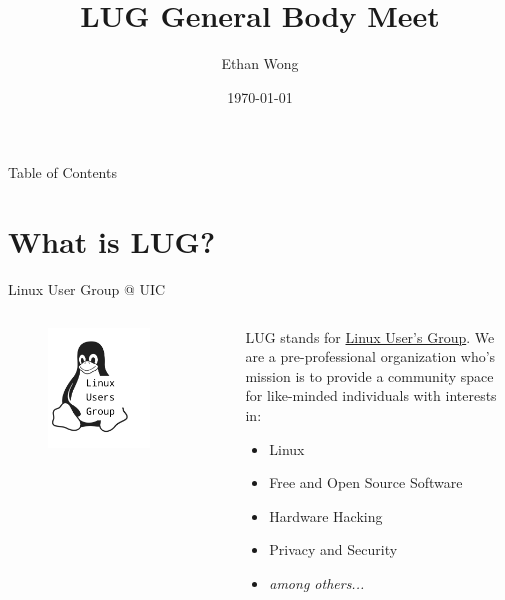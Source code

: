 \documentclass{beamer}
\title{LUG General Body Meet}
\author{Ethan Wong}
\date{\today}
\institute{Linux Users Group @ UIC}
\begin{document}
\begin{frame}
	\titlepage
\end{frame}

\begin{frame}{Table of Contents}
	\tableofcontents[pausesections]
\end{frame}

\section{What is LUG?}
\begin{frame}{Linux User Group @ UIC}
	\begin{columns}
		\begin{column}{0.5\textwidth}
			\begin{figure}
				\centering
				\includegraphics[width=0.75\textwidth]{lug-logo.png}
			\end{figure}
		\end{column}
		\begin{column}{0.5\textwidth}
			LUG stands for \underline{Linux User's Group}.
			\pause We are a pre-professional organization who's mission is to
			provide a community space for like-minded individuals with interests
			in:
			\begin{itemize}
				\item Linux
				\item Free and Open Source Software
				\item Hardware Hacking
				\item Privacy and Security
				\item \textit{among others...}
			\end{itemize}
		\end{column}
	\end{columns}
\end{frame}
\end{document}
